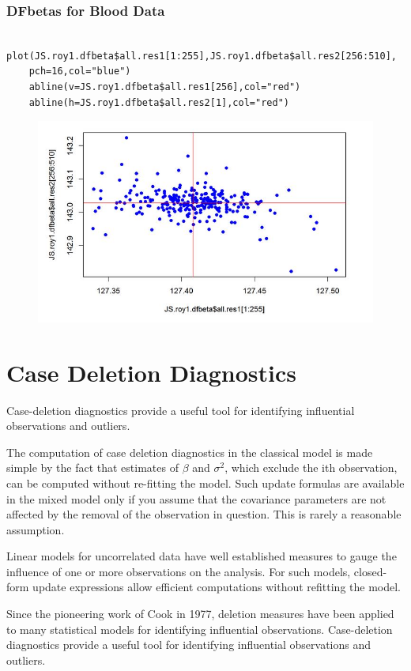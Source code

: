 \documentclass[Main.tex]{subfiles}
\begin{document}
\subsubsection{DFbetas for Blood Data}
\begin{framed}
	\begin{verbatim}
	plot(JS.roy1.dfbeta$all.res1[1:255],JS.roy1.dfbeta$all.res2[256:510],
	pch=16,col="blue")
	abline(v=JS.roy1.dfbeta$all.res1[256],col="red")
	abline(h=JS.roy1.dfbeta$all.res2[1],col="red")
	\end{verbatim}
\end{framed}
\begin{figure}
	\centering
	\includegraphics[width=0.7\linewidth]{images/dfbetas-JS-ROY}
	\caption{}
	\label{fig:dfbetas-JS-ROY}
\end{figure}


\section{Case Deletion Diagnostics}
Case-deletion diagnostics provide a useful tool for identifying influential observations and outliers.

The computation of case deletion diagnostics in the classical model is made simple by the fact that estimates of $\beta$ and $\sigma^2$, which exclude the ith observation, can be computed without re-fitting the model. Such update formulas are available in the mixed model only if you assume that the covariance parameters are not affected by the removal of the observation in question. This is rarely a reasonable assumption.

Linear models for uncorrelated data have well established measures to gauge the influence of one or more
observations on the analysis. For such models, closed-form update expressions allow efficient computations
without refitting the model. 


Since the pioneering work of Cook in 1977, deletion measures have been applied to many statistical models for identifying influential observations. Case-deletion diagnostics provide a useful tool for identifying influential observations and outliers.
\end{document}
